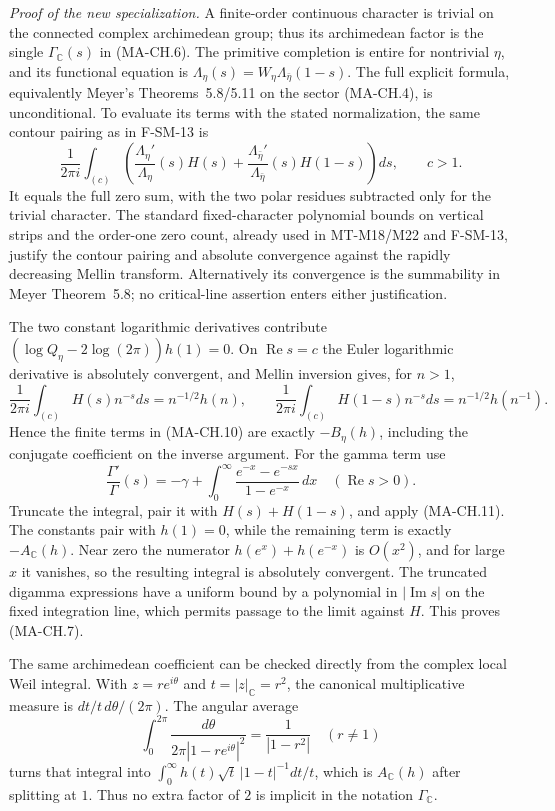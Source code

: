 \emph{Proof of the new specialization.}
A finite-order continuous character is trivial on the connected
complex archimedean group; thus its archimedean factor is the
single $\Gamma_{\mathbb C}(s)$ in (MA-CH.6).  The primitive
completion is entire for nontrivial $\eta$, and its functional
equation is
$\Lambda_\eta(s)=W_\eta\Lambda_{\bar\eta}(1-s)$.
The full explicit formula, equivalently Meyer's
Theorems~5.8/5.11 on the sector (MA-CH.4), is unconditional.
To evaluate its terms with the stated normalization, the same
contour pairing as in F-SM-13 is
\[
 \frac1{2\pi i}\int_{(c)}
 \left(\frac{\Lambda_\eta'}{\Lambda_\eta}(s)H(s)
       +\frac{\Lambda_{\bar\eta}'}{\Lambda_{\bar\eta}}(s)
                                                  H(1-s)\right)ds,
 \qquad c>1.
 \tag{MA-CH.10}
\]
It equals the full zero sum, with the two polar residues
subtracted only for the trivial character.  The standard
fixed-character polynomial bounds on vertical strips and the
order-one zero count, already used in MT-M18/M22 and F-SM-13,
justify the contour pairing and absolute convergence against
the rapidly decreasing Mellin transform.  Alternatively its
convergence is the summability in Meyer Theorem~5.8; no
critical-line assertion enters either justification.

The two constant logarithmic derivatives contribute
$(\log Q_\eta-2\log(2\pi))h(1)=0$.  On $\operatorname{Re}s=c$
the Euler logarithmic derivative is absolutely convergent,
and Mellin inversion gives, for $n>1$,
\[
 \frac1{2\pi i}\int_{(c)}H(s)n^{-s}ds=n^{-1/2}h(n),\qquad
 \frac1{2\pi i}\int_{(c)}H(1-s)n^{-s}ds=n^{-1/2}h(n^{-1}).
 \tag{MA-CH.11}
\]
Hence the finite terms in (MA-CH.10) are exactly $-B_\eta(h)$,
including the conjugate coefficient on the inverse argument.
For the gamma term use
\[
 \frac{\Gamma'}{\Gamma}(s)
    =-\gamma+\int_0^\infty
                    \frac{e^{-x}-e^{-sx}}{1-e^{-x}}\,dx
       \quad(\operatorname{Re}s>0).
\]
Truncate the integral, pair it with $H(s)+H(1-s)$, and apply
(MA-CH.11).  The constants pair with $h(1)=0$, while the
remaining term is exactly $-A_{\mathbb C}(h)$.  Near zero the
numerator $h(e^x)+h(e^{-x})$ is $O(x^2)$, and for large $x$
it vanishes, so the resulting integral is absolutely
convergent.  The truncated digamma expressions have a
uniform bound by a polynomial in $|\operatorname{Im}s|$ on
the fixed integration line, which permits passage to the
limit against $H$.  This proves (MA-CH.7).

The same archimedean coefficient can be checked directly from
the complex local Weil integral.  With $z=re^{i\theta}$ and
$t=|z|_{\mathbb C}=r^2$, the canonical multiplicative measure is
$dt/t\,d\theta/(2\pi)$.  The angular average
\[
 \int_0^{2\pi}\frac{d\theta}{2\pi|1-re^{i\theta}|^2}
                  =\frac1{|1-r^2|}
 \quad(r\ne1)
\]
turns that integral into
$\int_0^\infty h(t)\sqrt t\,|1-t|^{-1}dt/t$, which is
$A_{\mathbb C}(h)$ after splitting at $1$.
Thus no extra factor of $2$ is implicit in the notation
$\Gamma_{\mathbb C}$.

